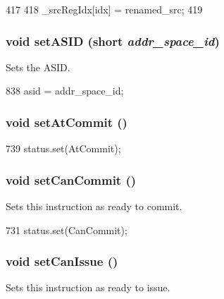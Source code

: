 \begin{DoxyCode}
417     {
418         _srcRegIdx[idx] = renamed_src;
419     }
\end{DoxyCode}
\hypertarget{classBaseDynInst_a0038e061ac1af4a45f8d301673483cd0}{
\subsubsection[{setASID}]{\setlength{\rightskip}{0pt plus 5cm}void setASID (short {\em addr\_\-space\_\-id})}}
\label{classBaseDynInst_a0038e061ac1af4a45f8d301673483cd0}
Sets the ASID. 


\begin{DoxyCode}
838 { asid = addr_space_id; }
\end{DoxyCode}
\hypertarget{classBaseDynInst_adef575a8b55171e005db4954a44e5caf}{
\subsubsection[{setAtCommit}]{\setlength{\rightskip}{0pt plus 5cm}void setAtCommit ()}}
\label{classBaseDynInst_adef575a8b55171e005db4954a44e5caf}



\begin{DoxyCode}
739 { status.set(AtCommit); }
\end{DoxyCode}
\hypertarget{classBaseDynInst_a0cbc886f9978503b587b4d7a7e3db728}{
\subsubsection[{setCanCommit}]{\setlength{\rightskip}{0pt plus 5cm}void setCanCommit ()}}
\label{classBaseDynInst_a0cbc886f9978503b587b4d7a7e3db728}
Sets this instruction as ready to commit. 


\begin{DoxyCode}
731 { status.set(CanCommit); }
\end{DoxyCode}
\hypertarget{classBaseDynInst_a2531049d5481976af68c8586015f0047}{
\subsubsection[{setCanIssue}]{\setlength{\rightskip}{0pt plus 5cm}void setCanIssue ()}}
\label{classBaseDynInst_a2531049d5481976af68c8586015f0047}
Sets this instruction as ready to issue. 



